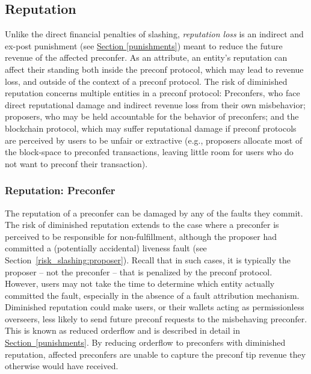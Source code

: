 \documentclass[a4paper]{article}
\theoremstyle{boldstyle}
\newcommand{\cm}[1]{\textcolor{blue}{\textbf{Conor:} #1}}
\newcommand{\ks}[1]{\textcolor{purple}{\textbf{Katerina:} #1}}
\begin{document}
\subsection{Reputation} \label{ReputationRisk}
    Unlike the direct financial penalties of slashing, \emph{reputation loss} is an indirect and ex-post punishment (see \hyperref[punishments]{Section \ref{punishments}}) meant to reduce the future revenue of the affected preconfer. 
    As an attribute, an entity's reputation can affect their standing both inside the preconf protocol, which may lead to revenue loss, and outside of the context of a preconf protocol.
    The risk of diminished reputation concerns multiple entities in a preconf protocol: Preconfers, who face direct reputational damage and indirect revenue loss from their own misbehavior; proposers, who may be held accountable for the behavior of preconfers; and the blockchain protocol, which may suffer reputational damage if preconf protocols are perceived by users to be unfair or extractive (e.g., proposers allocate most of the block-space to preconfed transactions, leaving little room for users who do not want to preconf their transaction).
    \subsubsection{Reputation: Preconfer}
    \label{risk_reputation:preconfer}
    The reputation of a preconfer can be damaged by any of the faults they commit. The risk of diminished reputation extends to the case where a preconfer is perceived to be responsible for non-fulfillment, although the proposer had committed a (potentially accidental) liveness fault (see Section~\ref{risk_slashing:proposer}). Recall that in such cases, it is typically the proposer -- not the preconfer -- that is penalized by the preconf protocol. However, users may not take the time to determine which entity actually committed the fault, especially in the absence of a fault attribution mechanism. Diminished reputation could make users, or their wallets acting as permissionless overseers, less likely to send future preconf requests to the misbehaving preconfer. This is known as reduced orderflow and is described in detail in \hyperref[punishments]{Section~\ref{punishments}}.
    By reducing orderflow to preconfers with diminished reputation, affected preconfers are unable to capture the preconf tip revenue they otherwise would have received.  
\end{document}
